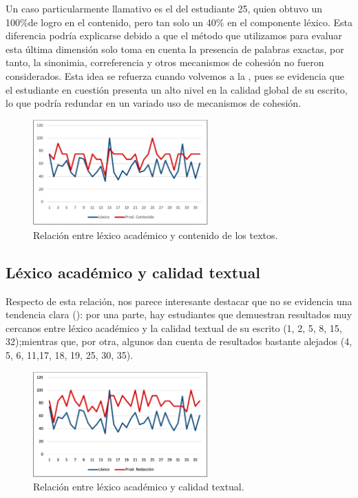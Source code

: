 \documentclass{textolivre-html}
\begin{document}
Un caso particularmente llamativo es el del estudiante 25, quien obtuvo un
100\%de logro en el contenido, pero tan solo un 40\% en el componente léxico.
Esta diferencia podría explicarse debido a que el método que utilizamos para
evaluar esta última dimensión solo toma en cuenta la presencia de palabras
exactas, por tanto, la sinonimia, correferencia y otros mecanismos de cohesión
no fueron considerados. Esta idea se refuerza cuando volvemos a la ,
pues se evidencia que el estudiante en cuestión presenta un alto nivel en la
calidad global de su escrito, lo que podría redundar en un variado uso de
mecanismos de cohesión.

\begin{figure}[htbp]
 \centering
 \includegraphics[width=0.6\textwidth]{figure03.pdf}
 \caption{Relación entre léxico académico y contenido de los textos.}
 \label{fig03}
\end{figure}


\subsection{Léxico académico y calidad textual}\label{sec-calidad}
Respecto de esta relación, nos parece interesante destacar que no se
evidencia una tendencia clara (): por una parte, hay estudiantes que
demuestran resultados muy cercanos entre léxico académico y la calidad textual
de su escrito (1, 2, 5, 8, 15, 32);mientras que, por otra, algunos dan cuenta
de resultados bastante alejados (4, 5, 6, 11,17, 18, 19, 25, 30, 35).

\begin{figure}[htbp]
 \centering
 \includegraphics[width=0.6\textwidth]{figure04.pdf}
 \caption{Relación entre léxico académico y calidad textual.}
 \label{fig04}
\end{figure}
\end{document}
